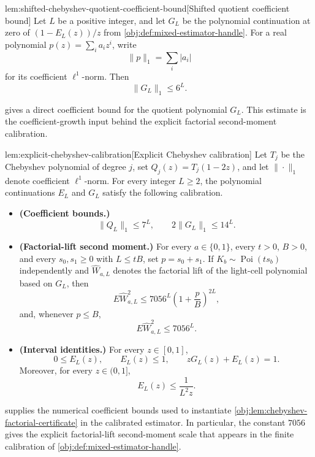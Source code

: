 \begin{lemmav}{lem:shifted-chebyshev-quotient-coefficient-bound}[Shifted quotient coefficient bound]
Let \(L\) be a positive integer, and let \(G_L\) be the polynomial continuation at zero of \((1-E_L(z))/z\) from \cref{obj:def:mixed-estimator-handle}.  For a real polynomial \(p(z)=\sum_i a_i z^i\), write
\[
\|p\|_1=\sum_i |a_i|
\]
for its coefficient \(\ell^1\)-norm.  Then
\[
\|G_L\|_1\le 6^L .
\]
\end{lemmav}

 gives a direct coefficient bound for the quotient polynomial \(G_L\). This estimate is the coefficient-growth input behind the explicit factorial second-moment calibration.

\begin{lemmav}{lem:explicit-chebyshev-calibration}[Explicit Chebyshev calibration]
Let \(T_j\) be the Chebyshev polynomial of degree \(j\), set \(Q_j(z)=T_j(1-2z)\), and let \(\|\cdot\|_1\) denote coefficient \(\ell^1\)-norm.  For every integer \(L\ge2\), the polynomial continuations \(E_L\) and \(G_L\) satisfy the following calibration.

\begin{itemize}
\item \textbf{(Coefficient bounds.)}
\[
\|Q_L\|_1\le 7^L,
\qquad
2\|G_L\|_1\le 14^L .
\]
\item \textbf{(Factorial-lift second moment.)}
For every \(a\in\{0,1\}\), every \(t>0\), \(B>0\), and every \(s_0,s_1\ge0\) with \(L\le tB\), set \(p=s_0+s_1\).  If \(K_b\sim\operatorname{Poi}(ts_b)\) independently and \(\widehat W_{a,L}\) denotes the factorial lift of the light-cell polynomial based on \(G_L\), then
\[
E\widehat W_{a,L}^{2}
\le
7056^L\left(1+\frac{p}{B}\right)^{2L},
\]
and, whenever \(p\le B\),
\[
E\widehat W_{a,L}^{2}\le 7056^L .
\]
\item \textbf{(Interval identities.)}
For every \(z\in[0,1]\),
\[
0\le E_L(z),
\qquad
E_L(z)\le 1,
\qquad
zG_L(z)+E_L(z)=1 .
\]
Moreover, for every \(z\in(0,1]\),
\[
E_L(z)\le \frac{1}{L^2z}.
\]
\end{itemize}
\end{lemmav}

 supplies the numerical coefficient bounds used to instantiate \cref{obj:lem:chebyshev-factorial-certificate} in the calibrated estimator. In particular, the constant \(7056\) gives the explicit factorial-lift second-moment scale that appears in the finite calibration of \cref{obj:def:mixed-estimator-handle}.
